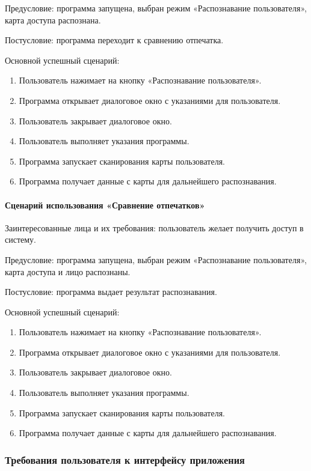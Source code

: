 Предусловие: программа запущена, выбран режим «Распознавание пользователя», карта доступа распознана.

Постусловие: программа переходит к сравнению отпечатка.

Основной успешный сценарий:
\begin{enumerate}
	\item Пользователь нажимает на кнопку «Распознавание пользователя».
	\item Программа открывает диалоговое окно с указаниями для пользователя.
	\item Пользователь закрывает диалоговое окно.
	\item Пользователь выполняет указания программы.
	\item Программа запускает сканирования карты пользователя.
	\item Программа получает данные с карты для дальнейшего распознавания.
\end{enumerate}

\paragraph{Сценарий использования «Сравнение отпечатков»}

Заинтересованные лица и их требования: пользователь желает получить доступ в систему.

Предусловие: программа запущена, выбран режим «Распознавание пользователя», карта доступа и лицо распознаны.

Постусловие: программа выдает результат распознавания.

Основной успешный сценарий:
\begin{enumerate}
	\item Пользователь нажимает на кнопку «Распознавание пользователя».
	\item Программа открывает диалоговое окно с указаниями для пользователя.
	\item Пользователь закрывает диалоговое окно.
	\item Пользователь выполняет указания программы.
	\item Программа запускает сканирования карты пользователя.
	\item Программа получает данные с карты для дальнейшего распознавания.
\end{enumerate}


\subsubsection{Требования пользователя к интерфейсу приложения}

